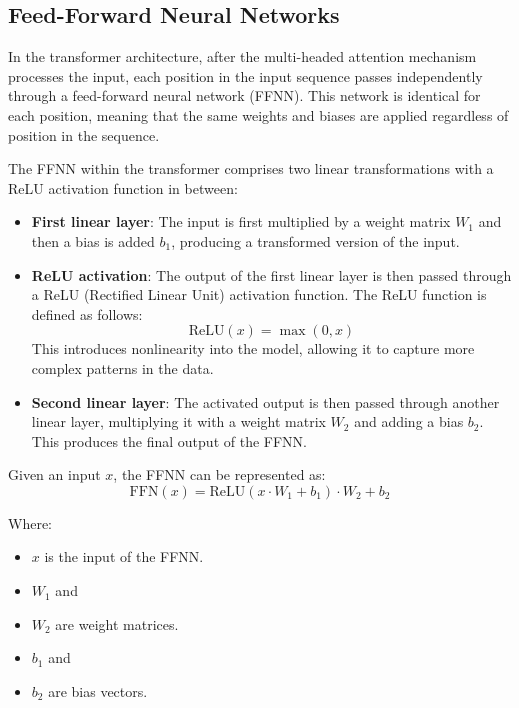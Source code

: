 \subsection{Feed-Forward Neural Networks}

In the transformer architecture, after the multi-headed attention mechanism processes the input, each position in the input sequence passes independently through a feed-forward neural network (FFNN). This network is identical for each position, meaning that the same weights and biases are applied regardless of position in the sequence.

The FFNN within the transformer comprises two linear transformations with a ReLU activation function in between:

\begin{itemize}
    \item \textbf{First linear layer}: The input is first multiplied by a weight matrix \( W_1 \) and then a bias is added \( b_1 \), producing a transformed version of the input.
    \item \textbf{ReLU activation}: The output of the first linear layer is then passed through a ReLU (Rectified Linear Unit) activation function. The ReLU function is defined as follows:
    \begin{equation}
        \text{ReLU}(x) = \max(0, x)
    \end{equation}
    This introduces nonlinearity into the model, allowing it to capture more complex patterns in the data.
    \item \textbf{Second linear layer}: The activated output is then passed through another linear layer, multiplying it with a weight matrix \( W_2 \) and adding a bias \( b_2 \). This produces the final output of the FFNN.
\end{itemize}

Given an input \( x \), the FFNN can be represented as:
\begin{equation}
    \text{FFN}(x) = \text{ReLU}(x \cdot W_1 + b_1) \cdot W_2 + b_2
\end{equation}

Where:
\begin{itemize}
    \item \( x \) is the input of the FFNN.
    \item \( W_1 \) and \item \( W_2 \) are weight matrices.
    \item \( b_1 \) and \item \( b_2 \) are bias vectors.
\end{itemize}

